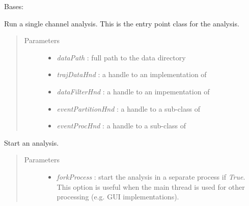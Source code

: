 \documentclass[letterpaper,10pt,english]{sphinxmanual}
\begin{document}
\begin{fulllineitems}
\label{api-doc/mosaic:mosaic.SingleChannelAnalysis.SingleChannelAnalysis}
Bases: \href{http://docs.python.org/library/functions.html\#object}{}

Run a single channel analysis. This is the entry point class for the analysis.
\begin{quote}\begin{description}
\item[{Parameters}] \leavevmode\begin{itemize}
\item {} 
\emph{dataPath} : full path to the data directory

\item {} 
\emph{trajDataHnd} : a handle to an implementation of 

\item {} 
\emph{dataFilterHnd} : a handle to an impementation of 

\item {} 
\emph{eventPartitionHnd} : a handle to a sub-class of 

\item {} 
\emph{eventProcHnd} : a handle to a sub-class of 

\end{itemize}

\end{description}\end{quote}

\begin{fulllineitems}
\label{api-doc/mosaic:mosaic.SingleChannelAnalysis.SingleChannelAnalysis.Run}
Start an analysis.
\begin{quote}\begin{description}
\item[{Parameters}] \leavevmode\begin{itemize}
\item {} 
\emph{forkProcess} : start the analysis in a separate process if \emph{True}. This option is useful when the main thread is used for other processing (e.g. GUI implementations).


\end{itemize}
\end{description}
\end{quote}
\end{fulllineitems}
\end{fulllineitems}
\end{document}
